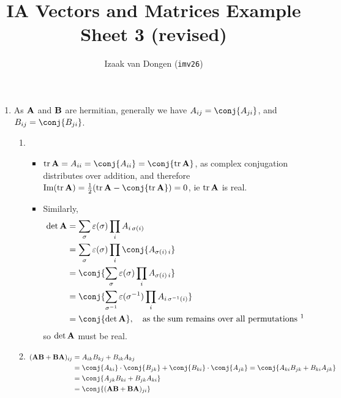 \documentclass[fleqn,a4paper,11pt]{article}
\title{IA Vectors and Matrices Example Sheet 3 (revised)}
\author{Izaak van Dongen (\texttt{imv26})}
\begin{document}
 \maketitle\thispagestyle{empty} %

 \begin{enumerate}[label=\textbf{\arabic*.}]
  \item
   As \(\mathbf{A}\) and \(\mathbf{B}\) are hermitian, generally we have
   \( A_{ij} = \conj{ A_{ji}}\), and
   \( B_{ij} = \conj{ B_{ji}}\).
   \begin{enumerate}[label=(\roman*)]
    \item
     \begin{itemize}
      \item
       \(\tr \mat A =  A_{ii} = \conj{ A_{ii}} = \conj{\tr \mat A}\), as
       complex conjugation distributes over addition, and therefore
       \(\Im(\tr \mat A) = \tfrac 12 (\tr \mat A - \conj{\tr \mat A}) = 0\), ie
       \(\operatorname{tr} \mathbf{A}\) is real.
      \item
       Similarly,
       \begin{align*}
        \det \mat A
         &= \sum_\sigma \epsilon(\sigma) \prod_i  A_{i\,\sigma(i)} \\
         &= \sum_\sigma \epsilon(\sigma) \prod_i \conj{ A_{\sigma(i)\,i}} \\
         &= \conj{\sum_\sigma \epsilon(\sigma) \prod_i  A_{\sigma(i)\,i}} \\
         &= \conj{\sum_{\sigma^{-1}} \epsilon(\sigma^{-1})
                 \prod_i  A_{i\,\sigma^{-1}(i)}} \\
         &= \conj{\det \mat A},\quad
         \text{as the sum remains over all permutations \footnotemark}
       \end{align*}
       so \(\det \mathbf{A}\) must be real.
     \end{itemize}
    \item \(
     \begin{aligned}[t]
     (\mat A\mat B + \mat B\mat A)_{ij}
       &=  A_{ik} B_{kj} +  B_{ik} A_{kj} \\
       &= \conj{ A_{ki}} \cdot \conj{ B_{jk}}
          + \conj{ B_{ki}} \cdot \conj{ A_{jk}}
       = \conj{ A_{ki} B_{jk} +  B_{ki} A_{jk}} \\
       &= \conj{ A_{jk} B_{ki} +  B_{jk} A_{ki}} \\
       &= \conj{(\mat A\mat B + \mat B\mat A)_{ji}}
     \end{aligned}\)


\end{enumerate}
\end{enumerate}
\end{document}
